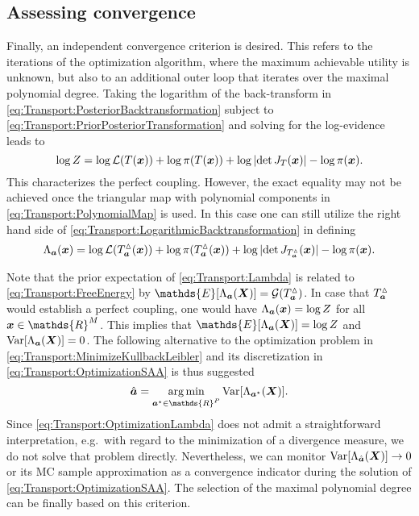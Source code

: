 \subsection{Assessing convergence}
Finally, an independent convergence criterion is desired.
This refers to the iterations of the optimization algorithm, where the maximum achievable utility is unknown, but also to an additional outer loop that iterates over the maximal polynomial degree.
Taking the logarithm of the back-transform in \cref{eq:Transport:PosteriorBacktransformation} subject to \cref{eq:Transport:PriorPosteriorTransformation}
and solving for the log-evidence leads to
\begin{equation} \label{eq:Transport:LogarithmicBacktransformation}
  \log Z = \log \mathcal{L}(T(\bm{x})) + \log \pi(T(\bm{x})) + \log \, \lvert \det J_T(\bm{x}) \rvert - \log \pi(\bm{x}).
\end{equation}
This characterizes the perfect coupling.
However, the exact equality may not be achieved once the triangular map with polynomial components in \cref{eq:Transport:PolynomialMap} is used.
In this case one can still utilize the right hand side of \cref{eq:Transport:LogarithmicBacktransformation} in defining
\begin{equation} \label{eq:Transport:Lambda}
  \Lambda_{\bm{a}}(\bm{x}) = \log \mathcal{L}(T_{\bm{a}}^\vartriangle(\bm{x}))
  + \log \pi(T_{\bm{a}}^\vartriangle(\bm{x})) + \log \, \lvert \det J_{T_{\bm{a}}^\vartriangle}(\bm{x}) \rvert - \log \pi(\bm{x}).
\end{equation}
\par %
Note that the prior expectation of \cref{eq:Transport:Lambda} is related to \cref{eq:Transport:FreeEnergy}
by \(\mathds{E}[\Lambda_{\bm{\coeffM}}(\bm{X})] = \mathcal{G}(\map_{\bm{\coeffM}}^\vartriangle)\).
In case that \(T_{\bm{a}}^\vartriangle\) would establish a perfect coupling, one would have \(\Lambda_{\bm{a}}(\bm{x}) = \log Z\) for all \(\bm{x} \in \mathds{R}^\dimParam\).
This implies that \(\mathds{E}[\Lambda_{\bm{\coeffM}}(\bm{X})] = \log \scale\) and \(\mathrm{Var}[\Lambda_{\bm{a}}(\bm{X})] = 0\).
The following alternative to the optimization problem in \cref{eq:Transport:MinimizeKullbackLeibler} and its discretization in \cref{eq:Transport:OptimizationSAA} is thus suggested
\begin{equation} \label{eq:Transport:OptimizationLambda}
  \hat{\bm{\coeffM}} = \operatorname*{arg\,min}_{\bm{\coeffM}^\star \in \mathds{R}^P} \mathrm{Var}[\Lambda_{\bm{\coeffM}^\star}(\bm{X})].
\end{equation}
Since \cref{eq:Transport:OptimizationLambda} does not admit a straightforward interpretation,
e.g.\ with regard to the minimization of a divergence measure, we do not solve that problem directly.
Nevertheless, we can monitor \(\mathrm{Var}[\Lambda_{\hat{\bm{a}}}(\bm{X})] \rightarrow 0\) or its MC sample approximation
as a convergence indicator during the solution of \cref{eq:Transport:OptimizationSAA}.
The selection of the maximal polynomial degree can be finally based on this criterion.